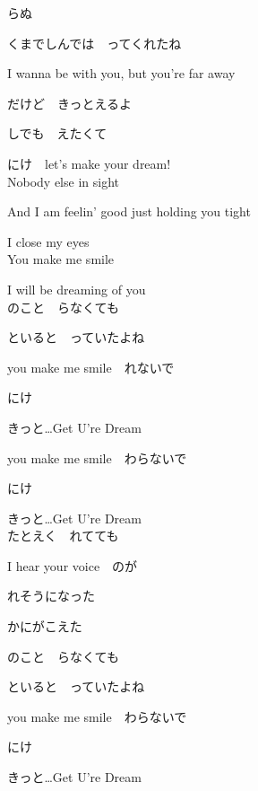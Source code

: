 {らぬ

くまでしんでは　ってくれたね

I wanna be with you, but you're far away

だけど　きっとえるよ

しでも　えたくて

にけ　let's make your dream!
\\

Nobody else in sight

And I am feelin' good just holding you tight

I close my eyes
\\

You make me smile

I will be dreaming of you
\\

のこと　らなくても

といると　っていたよね

you make me smile　れないで

にけ

きっと…Get U're Dream

you make me smile　わらないで

にけ

きっと…Get U're Dream
\\

たとえく　れてても

I hear your voice　のが

れそうになった

かにがこえた

のこと　らなくても

といると　っていたよね

you make me smile　わらないで

にけ

きっと…Get U're Dream

}